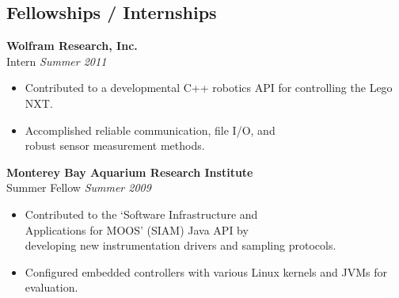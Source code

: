 \documentclass[11pt,twoside,a4paper]{article}
\begin{document}
{\begin{multicols}{2}
          \section*{Fellowships / Internships}
            \noindent
                \textbf{Wolfram Research, Inc. }\\
                 Intern \hfill \textsl{Summer 2011} \\
                \vspace{ -10px}
                \begin{itemize}[noitemsep,nolistsep]
                	\item Contributed to a developmental C++ robotics API for controlling the Lego NXT. 
                	\item Accomplished reliable communication, file I/O, and \\robust sensor measurement methods. 
                \end{itemize}
                \vspace{5px}
                \textbf{Monterey Bay Aquarium Research Institute}\\
                 Summer Fellow \hfill \textsl{Summer 2009}  \\
                \vspace{ -10px}	
                \begin{itemize}[noitemsep,nolistsep]
                	\item Contributed to the `Software Infrastructure and \\Applications for MOOS' (SIAM) Java API by \\developing new instrumentation drivers and sampling protocols.
                	\item Configured embedded controllers with various Linux kernels and JVMs for evaluation.
                \end{itemize}
                \vspace{5px}
                \vfill\null
                \columnbreak
                \vspace*{ 0.6 in }

\end{multicols}}
\end{document}
